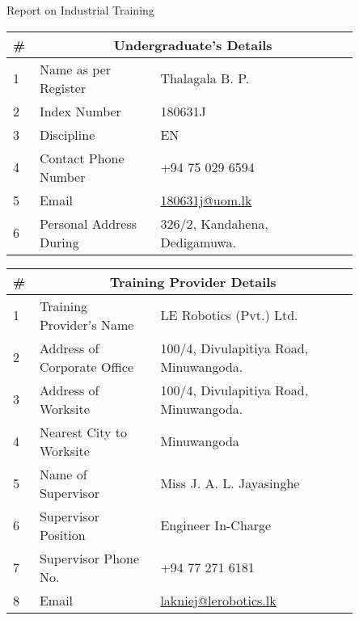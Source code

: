 \begin{center}
	{\large  Report on Industrial Training}
\end{center}


\vspace{10mm}

\begin{center}
	\begin{tabular}{|p{0.03\linewidth}  |p{0.31\linewidth}  |p{0.51\linewidth}  |}
	\hline 
	\# & \multicolumn{2}{c|}{\textbf{Undergraduate's Details}}\\ \hline
	1 & Name as per Register & Thalagala B. P. \\ \hline
	2 & Index Number & 180631J \\ \hline
	3 & Discipline & EN \\ \hline
	4 & Contact Phone Number & +94 75 029 6594 \\ \hline
	5 & Email & \href{180631j@uom.lk}{180631j@uom.lk} \\ \hline
	6 & Personal Address During & 326/2, Kandahena, Dedigamuwa. \\ \hline

\end{tabular}
\end{center}


\begin{center}
	\begin{tabular}{|p{0.03\linewidth}  |p{0.31\linewidth}  |p{0.51\linewidth}  |}
		\hline 
		\# & \multicolumn{2}{c|}{\textbf{Training Provider Details}}\\ \hline
		1 & Training Provider’s Name & LE Robotics (Pvt.) Ltd. \\ \hline
		2 & Address of Corporate Office & 100/4, Divulapitiya Road, Minuwangoda. \\ \hline
		3 & Address of Worksite & 100/4, Divulapitiya Road, Minuwangoda. \\ \hline
		4 & Nearest City to Worksite & Minuwangoda \\ \hline
		5 & Name of Supervisor & Miss J. A. L. Jayasinghe \\ \hline
		6 & Supervisor Position & Engineer In-Charge \\ \hline
		7 & Supervisor Phone No. & +94 77 271 6181 \\ \hline
		8 & Email & \href{lakniej@lerobotics.lk}{lakniej@lerobotics.lk} \\ \hline
		
	\end{tabular}
\end{center}


